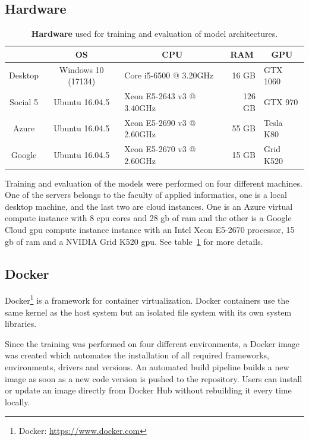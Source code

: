 \subsection{Hardware}
\begin{table}[h]
    \centering
    \begin{tabular}{@{}cclrl@{}}
        \toprule
        \multicolumn{1}{c}{\textbf{}}    & \multicolumn{1}{c}{\textbf{OS}} & \multicolumn{1}{c}{\textbf{CPU}}                    & \multicolumn{1}{c}{\textbf{RAM}} & \multicolumn{1}{c}{\textbf{GPU}}     \\ \midrule
        Desktop      & Windows 10 (17134)        & Core i5-6500 @ 3.20GHz     & 16 GB        & GTX 1060 \\
        Social 5     & Ubuntu 16.04.5            & Xeon E5-2643 v3 @ 3.40GHz  & 126 GB        & GTX 970 \\ 
        Azure        & Ubuntu 16.04.5            & Xeon E5-2690 v3 @ 2.60GHz  & 55 GB        & Tesla K80 \\ 
        Google        & Ubuntu 16.04.5            & Xeon E5-2670 v3 @ 2.60GHz  & 15 GB        & Grid K520 \\
        
        \bottomrule
	\end{tabular}
	\caption{\textbf{Hardware} used for training and evaluation of model architectures.}
    \label{tab:05_usedHardware}
\end{table}
Training and evaluation of the models were performed on four different machines. One of the servers belongs to the faculty of applied informatics, one is a local desktop machine, and the last two are cloud instances. One is an Azure virtual compute instance with 8 \gls{cpu} cores and 28 \gls{gb} of \gls{ram} and the other is a Google Cloud \gls{gpu} compute instance instance with an Intel Xeon E5-2670 processor, 15 \gls{gb} of \gls{ram} and a NVIDIA Grid K520 \gls{gpu}. See table~\ref{tab:05_usedHardware} for more details.



\subsection{Docker}


Docker\footnote{Docker: \url{https://www.docker.com}} is a framework for container virtualization. Docker containers use the same kernel as the host system but an isolated file system with its own system libraries. 
\medskip

Since the training was performed on four different environments, a Docker image was created which automates the installation of all required frameworks, environments, drivers and versions. An automated build pipeline builds a new image as soon as a new code version is pushed to the repository. Users can install or update an image directly from Docker Hub without rebuilding it every time locally.
\medskip

